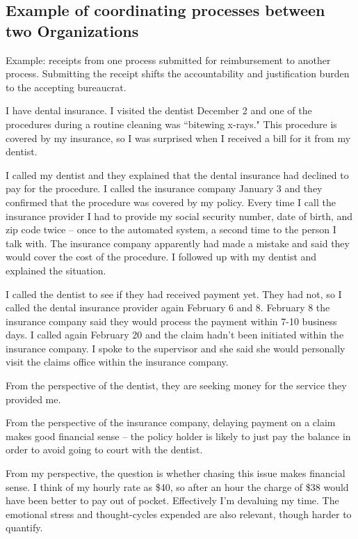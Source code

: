 \subsection*{Example of coordinating processes between two Organizations}
Example: receipts from one process submitted for reimbursement to another process.
Submitting the receipt shifts the accountability and justification burden to the accepting bureaucrat.




I have dental insurance. I visited the dentist December 2 and one of the procedures during a routine cleaning was ``bitewing x-rays." This procedure is covered by my insurance, so I was surprised when I received a bill for it from my dentist.

I called my dentist and they explained that the dental insurance had declined to pay for the procedure. I called the insurance company January 3 and they confirmed that the procedure was covered by my policy. 
Every time I call the insurance provider I had to provide my social security number, date of birth, and zip code twice -- once to the automated system, a second time to the person I talk with. The insurance company apparently had made a mistake and said they would cover the cost of the procedure. I followed up with my dentist and explained the situation.

I called the dentist to see if they had received payment yet. They had not, so I called the dental insurance provider again February 6 and 8. February 8 the insurance company said they would process the payment within 7-10 business days. I called again February 20 and the claim hadn't been initiated within the insurance company. I spoke to the supervisor and she said she would personally visit the claims office within the insurance company.

From the perspective of the dentist, they are seeking money for the service they provided me.

From the perspective of the insurance company, delaying payment on a claim makes good financial sense -- the policy holder is likely to just pay the balance in order to avoid going to court with the dentist.

From my perspective, the question is whether chasing this issue makes financial sense. I think of my hourly rate as \$40, so after an hour the charge of \$38 would have been better to pay out of pocket. Effectively I'm devaluing my time. The emotional stress and thought-cycles expended are also relevant, though harder to quantify.

